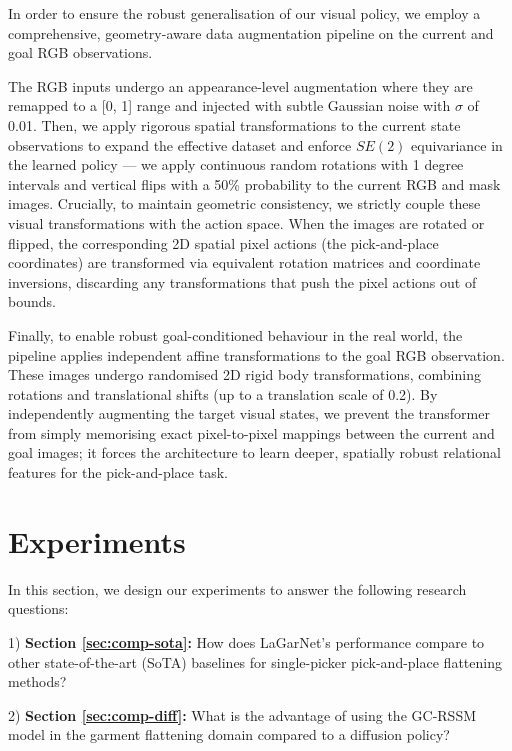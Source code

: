 \documentclass[journal]{IEEEtran}
\newcommand{\addinfo}[1]{\textcolor{myPurple}{#1}}
\newcommand{\addIncrementalg}[1]{\textcolor{mygreen}{#1}}
\begin{document}
\addinfo{In order to ensure the robust generalisation of our visual policy, we employ a comprehensive, geometry-aware data augmentation pipeline on the current and goal RGB observations.}

\addinfo{The RGB inputs undergo an appearance-level augmentation where they are remapped to a [0, 1] range and injected with subtle Gaussian noise with $\sigma$ of 0.01. Then, we apply rigorous spatial transformations to the current state observations to expand the effective dataset and enforce $SE(2)$ equivariance in the learned policy --- we apply continuous random rotations with 1 degree intervals and vertical flips with a 50\% probability to the current RGB and mask images. Crucially, to maintain geometric consistency, we strictly couple these visual transformations with the action space. When the images are rotated or flipped, the corresponding 2D spatial pixel actions (the pick-and-place coordinates) are transformed via equivalent rotation matrices and coordinate inversions,  discarding any transformations that push the pixel actions out of bounds.}

\addinfo{Finally, to enable robust goal-conditioned behaviour in the real world, the pipeline applies independent affine transformations to the goal RGB observation. These images undergo randomised 2D rigid body transformations, combining rotations and translational shifts (up to a translation scale of 0.2). By independently augmenting the target visual states, we prevent the transformer from simply memorising exact pixel-to-pixel mappings between the current and goal images; it forces the architecture to learn deeper, spatially robust relational features for the pick-and-place task.}

\section{Experiments} \label{sec:experiments}

\addIncrementalg{In this section, we design our experiments to answer the following research questions:}

\addIncrementalg{1) \textbf{Section \ref{sec:comp-sota}:} How does LaGarNet's performance compare to other state-of-the-art (SoTA) baselines for single-picker pick-and-place flattening methods?}

\addIncrementalg{2) \textbf{Section \ref{sec:comp-diff}:} What is the advantage of using the GC-RSSM model in the garment flattening domain compared to a diffusion policy?} 
\end{document}
